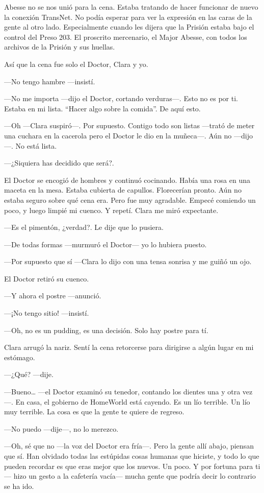 Abesse no se nos unió para la cena. Estaba tratando de hacer funcionar
de nuevo la conexión TransNet. No podía esperar para ver la expresión en
las caras de la gente al otro lado. Especialmente cuando les dijera que
la Prisión estaba bajo el control del Preso 203. El proscrito
mercenario, el Major Abesse, con todos los archivos de la Prisión y sus
huellas.

Así que la cena fue solo el Doctor, Clara y yo.

---No tengo hambre ---insistí.

---No me importa ---dijo el Doctor, cortando verduras---. Esto no es por
ti. Estaba en mi lista. ``Hacer algo sobre la comida''. De aquí esto.

---Oh ---Clara suspiró---. Por supuesto. Contigo todo son listas
---trató de meter una cuchara en la cacerola pero el Doctor le dio en la
muñeca---. Aún no ---dijo---. No está lista.

---¿Siquiera has decidido que será?.

El Doctor se encogió de hombres y continuó cocinando. Había una rosa en
una maceta en la mesa. Estaba cubierta de capullos. Florecerían pronto.
Aún no estaba seguro sobre qué cena era. Pero fue muy agradable. Empecé
comiendo un poco, y luego limpié mi cuenco. Y repetí. Clara me miró
expectante.

---Es el pimentón, ¿verdad?. Le dije que lo pusiera.

---De todas formas ---murmuró el Doctor--- yo lo hubiera puesto.

---Por supuesto que sí ---Clara lo dijo con una tensa sonrisa y me guiñó
un ojo.

El Doctor retiró su cuenco.

---Y ahora el postre ---anunció.

---¡No tengo sitio! ---insistí.

---Oh, no es un pudding, es una decisión. Solo hay postre para tí.

Clara arrugó la nariz. Sentí la cena retorcerse para dirigirse a algún
lugar en mi estómago.

---¿Qué? ---dije.

---Bueno\ldots{} ---el Doctor examinó su tenedor, contando los dientes
una y otra vez---. En casa, el gobierno de HomeWorld está cayendo. Es un
lío terrible. Un lío muy terrible. La cosa es que la gente te quiere de
regreso.

---No puedo ---dije---, no lo merezco.

---Oh, sé que no ---la voz del Doctor era fría---. Pero la gente allí
abajo, piensan que sí. Han olvidado todas las estúpidas cosas humanas
que hiciste, y todo lo que pueden recordar es que eras mejor que los
nuevos. Un poco. Y por fortuna para ti--- hizo un gesto a la cafetería
vacía--- mucha gente que podría decir lo contrario se ha ido.

